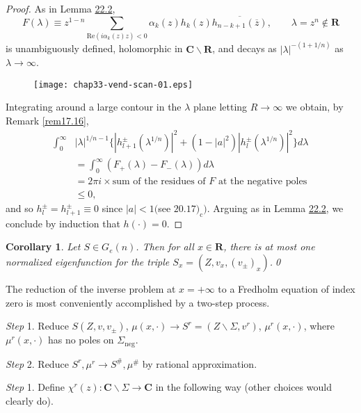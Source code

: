 \documentclass{surv-l}
\theoremstyle{plain}
\newtheorem{corollary}[theorem]{Corollary}
\theoremstyle{definition}
\numberwithin{equation}{chapter}
\begin{document}
\begin{proof}
As in Lemma \hyperref[lem22.2]{22.2},
\begin{equation*}
F(\lambda)\equiv z^{1-n}\sum_{\mathrm{Re}(i\alpha_{k}(z)z)<0}\alpha_{k}(z)h_{k}(z)\overline{h_{n-k+1}(\overline{z})},\qquad \lambda=z^{n}\not\in \mathbf{R}
\end{equation*}
is unambiguously defined, holomorphic in $\mathbf{C}\backslash \mathbf{R}$, and decays as $|\lambda|^{-(1+1/n)}$ as $\lambda \rightarrow\infty$.
\begin{figure}
\texttt{[image: chap33-vend-scan-01.eps]}
\caption{}
\end{figure}


Integrating around a large contour in the $\lambda$ plane letting $ R\rightarrow\infty$ we obtain, by Remark \ref{rem17.16},
\begin{align*}
\int_{0}^{\infty}&|\lambda|^{1/n-1}\{|h_{l+1}^{\pm}(\lambda^{1/n})|^{2}+(1-|a|^{2})|h_{l}^{\pm}(\lambda^{1/n})|^{2}\}d\lambda\\
&=\int_{0}^{\infty}(F_{+}(\lambda)-F_{-}(\lambda))d\lambda\\
&=2\pi i\times \text{sum of the residues of } F\text{ at the negative poles}\\
&\leq 0,
\end{align*}
and so $h_{l}^{\pm}=h_{l+1}^{\pm}\equiv 0$ since $|a|<1 ($see $20.17)_{\mathrm{c}})$. Arguing as in Lemma \hyperref[lem22.2]{22.2}, we conclude by induction that $h(\cdot)=0.$
\end{proof}

\setcounter{theorem}{15}
\begin{corollary}\label{coro33.16}
Let $S\in G_{e}(n)$. Then for all $x\in \mathbf{R}$, there is at most one normalized eigenfunction for the triple $S_{x}=(Z, v_{x}, (v_{\pm})_{x})$.\qed
\end{corollary}


The reduction of the inverse problem at $ x=+\infty$ to a Fredholm equation of index zero is most conveniently accomplished by a two-step process.

\emph{Step} 1. Reduce $S(Z,v, v_{\pm})$, $\mu(x, \cdot)\rightarrow S^{r}=(Z\backslash \Sigma, v^{r})$, $\mu^{r}(x,\cdot)$, where $\mu^{r}(x, \cdot)$ has no poles on $\Sigma_{\mathrm{neg}}$.

\emph{Step} 2. Reduce $S^{r},\mu^{r}\rightarrow S^{\#},\mu^{\#}$ by rational approximation.

\emph{Step} 1. Define $\chi^{r}(z):\mathbf{C}\backslash \Sigma\rightarrow \mathbf{C}$ in the following way (other choices would clearly do).
\end{document}
